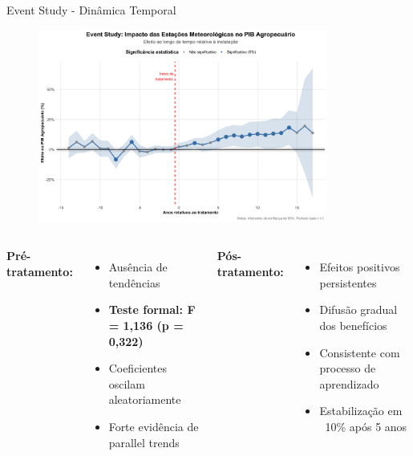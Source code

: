 \documentclass[10pt,aspectratio=169]{beamer}
\begin{document}
\begin{frame}{Event Study - Dinâmica Temporal}
\begin{figure}
\centering
\includegraphics[width=0.85\textwidth]{../../../data/outputs/presentation/event_study_enhanced.png}
\end{figure}

\begin{columns}
\textbf{Pré-tratamento:}
\begin{itemize}
    \item Ausência de tendências
    \item \textbf{Teste formal: F = 1,136 (p = 0,322)}
    \item Coeficientes oscilam aleatoriamente
    \item Forte evidência de parallel trends
\end{itemize}

\textbf{Pós-tratamento:}
\begin{itemize}
    \item Efeitos positivos persistentes
    \item Difusão gradual dos benefícios
    \item Consistente com processo de aprendizado
    \item Estabilização em ~10\% após 5 anos
\end{itemize}
\end{columns}
\end{frame}
\end{document}
